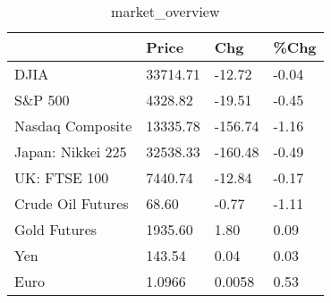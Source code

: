 \documentclass{article}%
\begin{document}
%


\begin{table}[htbp]%
\caption{market\_overview}%
\centering%
\begin{adjustbox}{width=1\textwidth}%
\begin{tabular}{llll}
\toprule
                  &    Price &     Chg &  \%Chg \\
\midrule
             DJIA & 33714.71 &  -12.72 & -0.04 \\
          S\&P 500 &  4328.82 &  -19.51 & -0.45 \\
 Nasdaq Composite & 13335.78 & -156.74 & -1.16 \\
Japan: Nikkei 225 & 32538.33 & -160.48 & -0.49 \\
     UK: FTSE 100 &  7440.74 &  -12.84 & -0.17 \\
Crude Oil Futures &    68.60 &   -0.77 & -1.11 \\
     Gold Futures &  1935.60 &    1.80 &  0.09 \\
              Yen &   143.54 &    0.04 &  0.03 \\
             Euro &   1.0966 &  0.0058 &  0.53 \\
\bottomrule
\end{tabular}
%
\end{adjustbox}%
\end{table}

%
\end{document}
